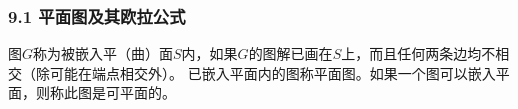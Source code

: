 \documentclass{beamer}
\begin{document}
\begin{CJK}{UTF8}{gbsn}

\begin{frame}
  \frametitle{9.1 平面图及其欧拉公式}
\pause
  \begin{definition9.1.1}
    图$G$称为被嵌入平（曲）面$S$内，如果$G$的图解已画在$S$上，而且任何两条边均不相交（除可能在端点相交外）。
已嵌入平面内的图称\alert{平面图}。如果一个图可以嵌入平面，则称此图是\alert{可平面}的。

\end{definition9.1.1}
\end{frame}


\end{CJK}
\end{document}
